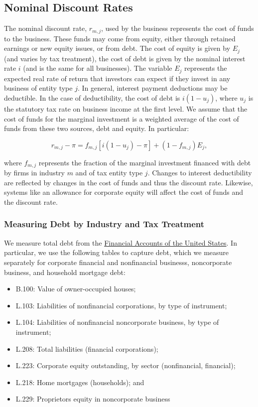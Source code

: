 \documentclass[article,11pt,letterpaper,fleqn]{article}
\theoremstyle{definition}
\numberwithin{equation}{section}
\begin{document}
\subsection{Nominal Discount Rates}

The nominal discount rate, $r_{m,j}$, used by the business represents the cost of funds to the business.  These funds may come from equity, either through retained earnings or new equity issues, or from debt.  The cost of equity is given by $E_{j}$ (and varies by tax treatment), the cost of debt is given by the nominal interest rate $i$ (and is the same for all businesses).  The variable $E_{j}$ represents the expected real rate of return that investors can expect if they invest in any business of entity type $j$.  In general, interest payment deductions may be deductible.  In the case of deductibility, the cost of debt is  $i(1-u_{j})$, where $u_{j}$ is the statutory tax rate on business income at the first level.  We assume that the cost of funds for the marginal investment is a weighted average of the cost of funds from these two sources, debt and equity.  In particular:

\begin{equation}
r_{m,j}-\pi = f_{m,j}\left[i(1-u_{j})-\pi\right] + (1-f_{m,j})E_{j},
\end{equation}

\noindent\noindent where $f_{m,j}$ represents the fraction of the marginal investment financed with debt by firms in industry $m$ and of tax entity type $j$.  Changes to interest deductibility are reflected by changes in the cost of funds and thus the discount rate.  Likewise, systems like an allowance for corporate equity will affect the cost of funds and the discount rate.

\subsubsection{Measuring Debt by Industry and Tax Treatment}
\label{sec:step3}

We measure total debt from the \href{http://www.federalreserve.gov/apps/fof/FOFTables.aspx}{Financial Accounts of the United States}.  In particular, we use the following tables to capture debt, which we measure separately for corporate financial and nonfinancial businesss, noncorporate business, and household mortgage debt:

\begin{itemize}
\item B.100: Value of owner-occupied houses;
\item L.103: Liabilities of nonfinancial corporations, by type of instrument;
\item L.104: Liabilities of nonfinancial noncorporate business, by type of instrument;
\item L.208: Total liabilities (financial corporations);
\item L.223: Corporate equity outstanding, by sector (nonfinancial, financial);
\item L.218: Home mortgages (households); and
\item L.229: Proprietors equity in noncorporate business
\end{itemize}
\end{document}
